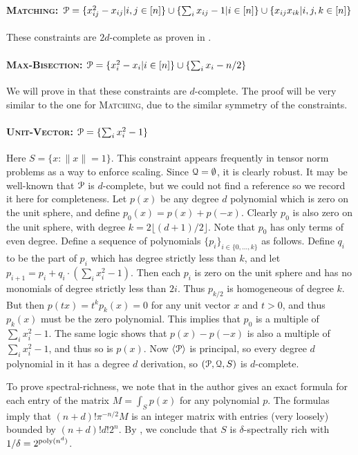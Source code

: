 \documentclass[a4paper,UKenglish]{lipics-v2016}
\begin{document}
\paragraph*{\textsc{Matching}: $\mathcal P = \{x_{ij}^2 - x_{ij} | i,j \in [n]\} \cup \{\sum_i x_{ij} - 1 | i \in [n]\} \cup \{x_{ij}x_{ik} | i,j,k \in [n]\}$} These constraints are $2d$-complete as proven in \cite{Braun:2016:MPN:2884435.2884510}.

\paragraph*{\textsc{Max-Bisection}: $\mathcal P = \{x_i^2 - x_i | i \in [n]\} \cup \{\sum_i x_i - n/2\}$} We will prove in  that these constraints are $d$-complete. The proof will be very similar to the one for \textsc{Matching}, due to the similar symmetry of the constraints.

\paragraph*{\textsc{Unit-Vector}: $\mathcal P = \{\sum_i x_i^2 - 1\}$} Here $S = \{x: \|x\| = 1\}$. This constraint appears frequently in tensor norm problems as a way to enforce scaling. Since $\mathcal Q = \emptyset$, it is clearly robust. It may be well-known that $\mathcal P$ is $d$-complete, but we could not find a reference so we record it here for completeness. Let $p(x)$ be any degree $d$ polynomial which is zero on the unit sphere, and define $p_0(x) = p(x) + p(-x)$. Clearly $p_0$ is also zero on the unit sphere, with degree $k = 2\lfloor (d+1)/2 \rfloor$. Note that $p_0$ has only terms of even degree. 
Define a sequence of polynomials $\{p_i\}_{i \in \{0,\ldots, k\}}$ as follows.
Define $q_i$ to be the part of $p_i$ which has degree strictly less than $k$, and let $p_{i+1} = p_i + q_i\cdot(\sum_i x_i^2 - 1)$. Then each $p_i$ is zero on the unit sphere and has no monomials of degree strictly less than $2i$. Thus $p_{k/2}$ is homogeneous of degree $k$. But then $p(tx) = t^kp_k(x) = 0$ for any unit vector $x$ and $t > 0$, and thus $p_k(x)$ must be the zero polynomial. This implies that $p_0$ is a multiple of $\sum_i x_i^2 - 1$. The same logic shows that $p(x) - p(-x)$ is also a multiple of $\sum_i x_i^2 - 1$, and thus so is $p(x)$. Now $\langle \mathcal P\rangle$ is principal, so every degree $d$ polynomial in it has a degree $d$ derivation, so $(\mathcal P, \mathcal Q, S)$ is $d$-complete.

To prove spectral-richness, we note that in \cite{10.2307/2695802} the author gives an exact formula for each entry of the matrix $M = \int_{S} p(x)$ for any polynomial $p$. The formulas imply that $(n+d)!\pi^{-n/2} M$ is an integer matrix with entries (very loosely) bounded by $(n+d)!d!2^n$. By , we conclude that $S$ is $\delta$-spectrally rich with $1/\delta = 2^{\operatorname{poly}(n^d)}$.
\end{document}
